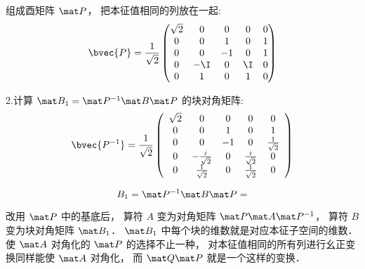 组成酉矩阵 $\mat P$， 把本征值相同的列放在一起:
\begin{equation}
\bvec{P}=\frac{1}{\sqrt{2}}\begin{pmatrix}
\sqrt{2}&0&0&0&0\\0&0&1&0&1\\0&0
&-1&0&1\\0&-\I&0&\I&0\\0&1&0&1&0
\end{pmatrix}
\end{equation}

2.计算 $\mat B_1 = \mat P^{-1} \mat B\mat P$ 的块对角矩阵:
\begin{equation}
\bvec{P^{-1}}=\frac{1}{\sqrt{2}}\left(
\begin{array}{ccccc}
 \sqrt{2} & 0 & 0 & 0 & 0 \\
 0 & 0 & 1 & 0 & 1 \\
 0 & 0 & -1 & 0 & \frac{1}{\sqrt{2}} \\
 0 & -\frac{i}{\sqrt{2}} & 0 & \frac{i}{\sqrt{2}} & 0 \\
 0 & \frac{1}{\sqrt{2}} & 0 & \frac{1}{\sqrt{2}} & 0 \\
\end{array}
\right)
\end{equation}

\begin{equation}
B_1=\mat P^{-1} \mat B\mat P=
\end{equation}

改用 $\mat P$ 中的基底后， 算符 $A$ 变为对角矩阵 $\mat P \mat A\mat P^{-1}$， 算符 $B$ 变为块对角矩阵 $\mat B_1$． $\mat B_1$ 中每个块的维数就是对应本征子空间的维数． 使 $\mat A$ 对角化的 $\mat P$ 的选择不止一种， 对本征值相同的所有列进行幺正变换同样能使 $\mat A$ 对角化， 而 $\mat Q\mat P$ 就是一个这样的变换．

